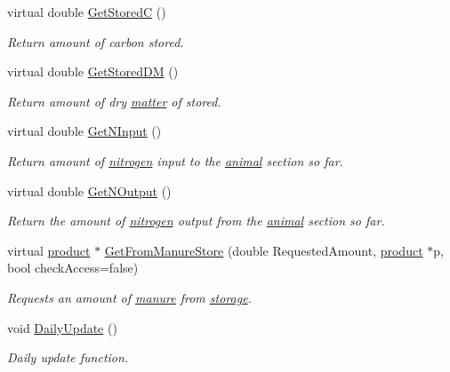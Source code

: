 \begin{DoxyCompactItemize}
virtual double \hyperlink{classanimal_section_ad17932a2af90cbb6b9b90ddb4c23ecd5}{GetStoredC} ()
\begin{DoxyCompactList}\small\item\em Return amount of carbon stored. \item\end{DoxyCompactList}\item 
virtual double \hyperlink{classanimal_section_a789377838a3e4c5e1eb8739f15014a3f}{GetStoredDM} ()
\begin{DoxyCompactList}\small\item\em Return amount of dry \hyperlink{classmatter}{matter} of stored. \item\end{DoxyCompactList}\item 
virtual double \hyperlink{classanimal_section_a72672d9b6cef359ce6506826483858ed}{GetNInput} ()
\begin{DoxyCompactList}\small\item\em Return amount of \hyperlink{classnitrogen}{nitrogen} input to the \hyperlink{classanimal}{animal} section so far. \item\end{DoxyCompactList}\item 
virtual double \hyperlink{classanimal_section_a3c7dd42cc4cc52620e5aee9fe458d823}{GetNOutput} ()
\begin{DoxyCompactList}\small\item\em Return the amount of \hyperlink{classnitrogen}{nitrogen} output from the \hyperlink{classanimal}{animal} section so far. \item\end{DoxyCompactList}\item 
virtual \hyperlink{classproduct}{product} $\ast$ \hyperlink{classanimal_section_a6fe2d73802cbac7f72ba723de24f5db4}{GetFromManureStore} (double RequestedAmount, \hyperlink{classproduct}{product} $\ast$p, bool checkAccess=false)
\begin{DoxyCompactList}\small\item\em Requests an amount of \hyperlink{classmanure}{manure} from \hyperlink{classstorage}{storage}. \item\end{DoxyCompactList}\item 
void \hyperlink{classanimal_section_aadfcafebdfc59ced126788f1425e3780}{DailyUpdate} ()
\begin{DoxyCompactList}\small\item\em Daily update function. \item\end{DoxyCompactList}\item 

\end{DoxyCompactItemize}
